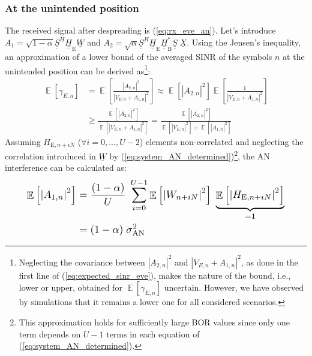 \documentclass[conference]{IEEEtran}
\begin{document}
\subsubsection{At the unintended position}
\label{subsub:unintended_sinr}
The received signal after despreading is (\ref{eq:rx_eve_an}). Let's introduce $A_1  = \sqrt{1-\alpha} \underline{\underline{S}}^H \underline{\underline{H}}_{\text{E}} \underline{W}$ and $A_2 = \sqrt{\alpha}  \underline{\underline{S}}^H  \underline{\underline{H}}_{\text{E}}  \underline{\underline{H}}^*_{\text{B}} \underline{\underline{S}}\; \underline{X}$. Using the Jensen's inequality, an approximation of a lower bound of the averaged SINR of the symbols $n$ at the unintended position can be derived as\footnote{Neglecting the covariance between $\left|A_{2,n}\right|^2$ and $\left| V_{E,n} + A_{1,n}\right|^2$, as  done in the first line of (\ref{eq:expected_sinr_eve}), makes the nature of the bound, i.e., lower or upper, obtained for $\mathop{\mathbb{E}} \left[\gamma_{E,n}\right]$ uncertain. However, we have observed by simulations that it remains a lower one for all considered scenarios.}:
\begin{equation}
\begin{split}
    \mathop{\mathbb{E}} \left[\gamma_{E,n}\right] &= \mathop{\mathbb{E}} \left[ \frac{  \left| A_{2,n} \right|^2  }{  \left| V_{E,n} + A_{1,n} \right|^2 }  \right]  \approx  \mathop{\mathbb{E}} \left[ \left| A_{2,n} \right|^2 \right]  \mathop{\mathbb{E}} \left[ \frac{1}{ \left| V_{E,n} + A_{1,n} \right|^2} \right]  \\
    & \geq \frac{\mathop{\mathbb{E}} \left[ \left| A_{2,n} \right|^2 \right] }{\mathop{\mathbb{E}} \left[\left| V_{E,n} + A_{1,n} \right|^2 \right]} =  \frac{\mathop{\mathbb{E}} \left[ \left| A_{2,n} \right|^2 \right] }{\mathop{\mathbb{E}} \left[\left| V_{E,n} \right|^2 \right] +  \mathop{\mathbb{E}} \left[\left|A_{1,n} \right|^2 \right]}
    \label{eq:expected_sinr_eve}
\end{split}
\end{equation}
Assuming $H_{\text{E}, n + iN}$ ($\forall i = 0,...,U-2$) elements non-correlated and neglecting the correlation introduced in $\underline{W}$ by (\ref{eq:system_AN_determined})\footnote{This approximation holds for sufficiently large BOR values since only one term depends on $U-1$ terms in each equation of (\ref{eq:system_AN_determined}).}, the AN interference can be calculated as:
\begin{equation}
\resizebox{0.89\hsize}{!}{$
    \begin{split}
        \mathop{\mathbb{E}}\left[ \left| A_{1,n} \right|^2 \right]
        &= \frac{(1-\alpha)}{U} \; \sum_{i=0}^{U-1} \mathop{\mathbb{E}}\left[\left| W_{n+iN} \right|^2 \right]  \; \underbrace{\mathop{\mathbb{E}}\left[\left|  H_{\text{E}, n + iN} \right|^2 \right]}_{=1} \\
        &= (1-\alpha)\; \sigma^2_{\text{AN}}
    \end{split}$}
\end{equation}
\end{document}
